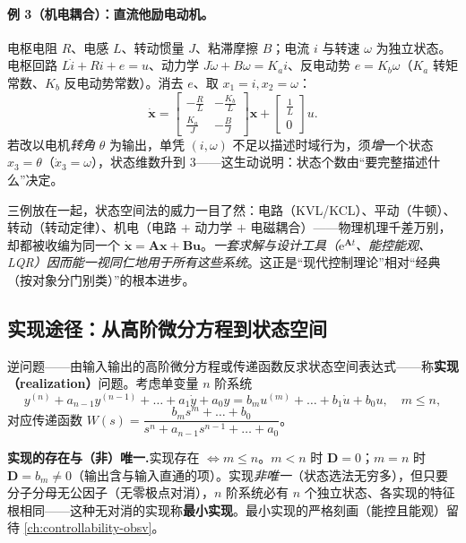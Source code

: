 \paragraph{例 3（机电耦合）：直流他励电动机。}
电枢电阻 $R$、电感 $L$、转动惯量 $J$、粘滞摩擦 $B$；电流 $i$ 与转速 $\omega$ 为独立状态。电枢回路 $L\dot i+Ri+e=u$、动力学 $J\dot\omega+B\omega=K_a i$、反电动势 $e=K_b\omega$（$K_a$ 转矩常数、$K_b$ 反电动势常数）。消去 $e$、取 $x_1=i,x_2=\omega$：
\begin{equation}
  \dot{\mathbf{x}}=\begin{bmatrix}-\tfrac{R}{L}&-\tfrac{K_b}{L}\\[2pt]\tfrac{K_a}{J}&-\tfrac{B}{J}\end{bmatrix}\mathbf{x}+\begin{bmatrix}\tfrac{1}{L}\\0\end{bmatrix}u.
  \label{eq:ssb-motor-ss}
\end{equation}
若改以电机\emph{转角} $\theta$ 为输出，单凭 $(i,\omega)$ 不足以描述时域行为，须\emph{增}一个状态 $x_3=\theta$（$\dot x_3=\omega$），状态维数升到 3——这生动说明：状态个数由“要完整描述什么”决定。

\begin{insight}
三例放在一起，状态空间法的威力一目了然：电路（KVL/KCL）、平动（牛顿）、转动（转动定律）、机电（电路 $+$ 动力学 $+$ 电磁耦合）——物理机理千差万别，却都被收编为同一个 $\dot{\mathbf{x}}=\mathbf{A}\mathbf{x}+\mathbf{B}\mathbf{u}$。\emph{一套求解与设计工具（$\mathrm{e}^{\mathbf{A}t}$、能控能观、LQR）因而能一视同仁地用于所有这些系统}。这正是“现代控制理论”相对“经典（按对象分门别类）”的根本进步。
\end{insight}

\subsection{实现途径：从高阶微分方程到状态空间}
\label{sec:ssb-realization}

逆问题——由输入输出的高阶微分方程或传递函数反求状态空间表达式——称\textbf{实现（realization）}问题。考虑单变量 $n$ 阶系统
\begin{equation}
  y^{(n)}+a_{n-1}y^{(n-1)}+\dots+a_1\dot y+a_0 y=b_m u^{(m)}+\dots+b_1\dot u+b_0 u,\quad m\le n,
  \label{eq:ssb-highorder}
\end{equation}
对应传递函数 $W(s)=\dfrac{b_m s^m+\dots+b_0}{s^n+a_{n-1}s^{n-1}+\dots+a_0}$。

\begin{note}
\textbf{实现的存在与（非）唯一.}\;实现存在 $\iff m\le n$。$m<n$ 时 $\mathbf{D}=0$；$m=n$ 时 $\mathbf{D}=b_m\neq0$（输出含与输入直通的项）。实现\emph{非唯一}（状态选法无穷多），但只要分子分母无公因子（无零极点对消），$n$ 阶系统必有 $n$ 个独立状态、各实现的特征根相同——这种无对消的实现称\textbf{最小实现}\cite{liubao2006modern,zhang2017modern}。最小实现的严格刻画（能控且能观）留待 \cref{ch:controllability-obsv}。
\end{note}

